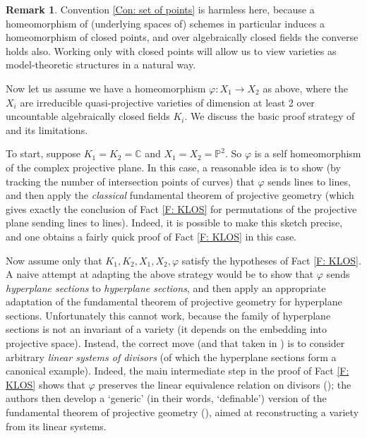 \documentclass{amsart}
\theoremstyle{definition}
\newtheorem{remark}[theorem]{Remark}
\begin{document}
\begin{remark}
    Convention \ref{Con: set of points} is harmless here, because a homeomorphism of (underlying spaces of) schemes in particular induces a homeomorphism of closed points, and over algebraically closed fields the converse holds also. Working only with closed points will allow us to view varieties as model-theoretic structures in a natural way.
\end{remark}

Now let us assume we have a homeomorphism $\varphi:X_1\rightarrow X_2$ as above, where the $X_i$ are irreducible quasi-projective varieties of dimension at least 2 over uncountable algebraically closed fields $K_i$. We discuss the basic proof strategy of \cite{KLOS} and its limitations.

To start, suppose $K_1=K_2=\mathbb C$ and $X_1=X_2=\mathbb P^2$. So $\varphi$ is a self homeomorphism of the complex projective plane. In this case, a reasonable idea is to show (by tracking the number of intersection points of curves) that $\varphi$ sends lines to lines, and then apply the \textit{classical} fundamental theorem of projective geometry (which gives exactly the conclusion of Fact \ref{F: KLOS} for permutations of the projective plane sending lines to lines). Indeed, it is possible to make this sketch precise, and one obtains a fairly quick proof of Fact \ref{F: KLOS} in this case.

Now assume only that $K_1,K_2,X_1,X_2,\varphi$ satisfy the hypotheses of Fact \ref{F: KLOS}. A naive attempt at adapting the above strategy would be to show that $\varphi$ sends \textit{hyperplane sections} to \textit{hyperplane sections}, and then apply an appropriate adaptation of the fundamental theorem of projective geometry for hyperplane sections. Unfortunately this cannot work, because the family of hyperplane sections is not an invariant of a variety (it depends on the embedding into projective space). Instead, the correct move (and that taken in \cite{KLOS}) is to consider arbitrary \textit{linear systems of divisors} (of which the hyperplane sections form a canonical example). Indeed, the main intermediate step in the proof of Fact \ref{F: KLOS} shows that $\varphi$ preserves the linear equivalence relation on divisors (\cite[Theorem 7.6.1]{KLOS}); the authors then develop a `generic' (in their words, `definable') version of the fundamental theorem of projective geometry (\cite[Theorem 3.1.5]{KLOS}), aimed at reconstructing a variety from its linear systems.
\end{document}
